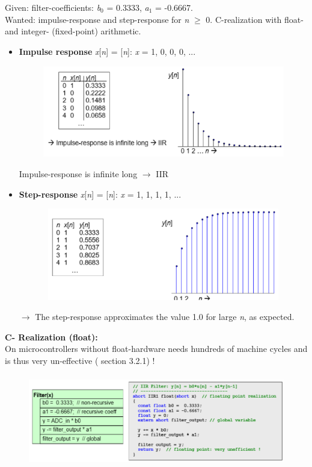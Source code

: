 Given:   filter-coefficients: \textit{b}${}_{0}$ = 0.3333, \textit{a}${}_{1}$ = -0.6667. \\
Wanted:  impulse-response and step-response for \textit{n} $\mathrm{\ge}$ 0.     C-realization with float- and integer- (fixed-point) arithmetic.

\begin{itemize}
\item \textbf{Impulse response}  \textit{x}[\textit{n}] = [\textit{n}]:   \textit{x} = { 1, 0, 0, 0, ...}
    \begin{figure}[h]
    \centering
    \includegraphics[width=12cm, height=4cm]{Images/image144.png}
    \label{fig:Fig 97}
    \end{figure}

Impulse-response is infinite long \hspace{1cm} $\rightarrow$ IIR

\item \textbf{Step-response} \textit{x}[\textit{n}] = [\textit{n}]:   \textit{x} = {1, 1, 1, 1, ...}
	\begin{figure}[h]
    \centering
    \includegraphics[width=12cm, height=4cm]{Images/image145.png}
    \label{fig:Fig 98}
    \end{figure}

$\rightarrow$ The step-response approximates the value 1.0 for large \textit{n}, as expected.
\end{itemize}

{\rot\bf C- Realization (float): } \\

On microcontrollers without float-hardware needs hundreds of machine cycles and is thus very un-effective ( section 3.2.1) !
\newpage
	\begin{figure}[h]
    \centering
    \includegraphics[width=14cm, height=4cm]{Images/image146.png}
    \label{fig:Fig 99}
    \end{figure}

